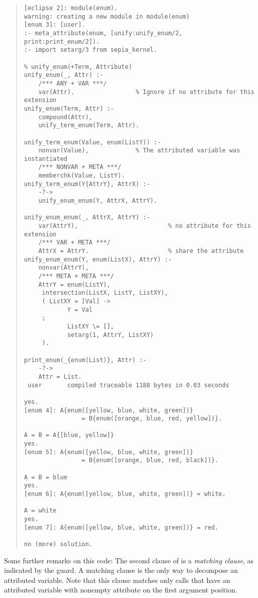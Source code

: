 \begin{quote}
\begin{verbatim}
[eclipse 2]: module(enum).
warning: creating a new module in module(enum)
[enum 3]: [user].
:- meta_attribute(enum, [unify:unify_enum/2, print:print_enum/2]).
:- import setarg/3 from sepia_kernel.

% unify_enum(+Term, Attribute)
unify_enum(_, Attr) :-
    /*** ANY + VAR ***/
    var(Attr).                 % Ignore if no attribute for this extension
unify_enum(Term, Attr) :-
    compound(Attr),
    unify_term_enum(Term, Attr).

unify_term_enum(Value, enum(ListY)) :-
    nonvar(Value),             % The attributed variable was instantiated
    /*** NONVAR + META ***/
    memberchk(Value, ListY).
unify_term_enum(Y{AttrY}, AttrX) :-
    -?->
    unify_enum_enum(Y, AttrX, AttrY).

unify_enum_enum(_, AttrX, AttrY) :-
    var(AttrY),                         % no attribute for this extension
    /*** VAR + META ***/
    AttrX = AttrY.                      % share the attribute
unify_enum_enum(Y, enum(ListX), AttrY) :-
    nonvar(AttrY),
    /*** META + META ***/
    AttrY = enum(ListY),
     intersection(ListX, ListY, ListXY),
     ( ListXY = [Val] ->
            Y = Val
     ;
            ListXY \= [],
            setarg(1, AttrY, ListXY)
     ).

print_enum(_{enum(List)}, Attr) :-
    -?->
    Attr = List.
 user       compiled traceable 1188 bytes in 0.03 seconds

yes.
[enum 4]: A{enum([yellow, blue, white, green])}
                = B{enum([orange, blue, red, yellow])}.

A = B = A{[blue, yellow]}
yes.
[enum 5]: A{enum([yellow, blue, white, green])}
                = B{enum([orange, blue, red, black])}.

A = B = blue
yes.
[enum 6]: A{enum([yellow, blue, white, green])} = white.

A = white
yes.
[enum 7]: A{enum([yellow, blue, white, green])} = red.

no (more) solution.

\end{verbatim}
\end{quote}

Some further remarks on this code:
The second clause of 
is a \emph{matching clause}, as indicated
by the  guard.
A matching clause is the only way to decompose an attributed variable.
Note that this clause matches only calls that have an attributed variable
with nonempty  attribute on the
first argument position.

